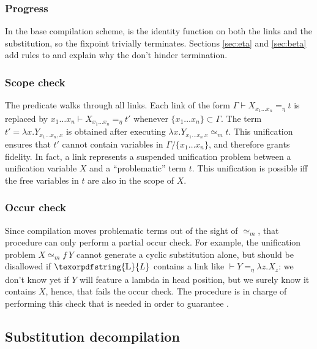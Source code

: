 \documentclass[sigconf,natbib=false,review]{acmart}
\newcommand{\UnifRel}{\ensuremath{\simeq}}
\newcommand{\Ue}{\ensuremath{\UnifRel_m}\xspace}
\newcommand{\linketaM}[3]{\ensuremath{#1 \vdash #2 =_\eta #3}}
\newcommand{\linkStore}{\texorpdfstring{\ensuremath{\mathbb{L}}\xspace}{L}}
\begin{document}


\subsubsection{Progress}
In the base compilation scheme,  is the identity function
on both the links and the substitution, so the fixpoint trivially terminates.
Sections \ref{sec:eta} and \ref{sec:beta} add rules to 
and explain why the don't hinder termination.

\subsubsection{Scope check}\label{sec:sc}
The predicate  walks through all links. 
Each link of the form \linketaM{\Gamma}{X_{x_1\ldots x_n}}{t} is replaced by
\linketaM{{x_1\ldots x_n}}{X_{x_1\ldots x_n}}{t'} whenever $\{x_1\ldots x_n\} \subset \Gamma$.
The term $t' = \lambda x.Y_{{x_1\ldots x_n},x}$ is obtained after
executing $\lambda x.Y_{{x_1\ldots x_n}~x} \Ue t$. This unification
ensures that $t'$ cannot contain variables in $\Gamma / \{x_1\ldots x_n\}$,
and therefore grants fidelity.
In fact, a link represents a suspended unification problem between a unification variable $X$
and a ``problematic'' term $t$. This unification is possible iff 
the free variables in $t$ are also in the scope of $X$.

\subsubsection{Occur check}\label{sec:oc}
Since compilation moves problematic terms out of the sight of \Ue{},
that procedure can only perform a partial occur check. For example, the
unification problem $X \Ue f~Y$ cannot generate a cyclic substitution alone,
but should be disallowed if $\linkStore$ contains a link like
$\linketaM{}{Y}{\lambda z.X_z}$: we don't know yet if $Y$ will feature
a lambda in head position, but we surely know it contains $X$, hence,
that fails the occur check.
The procedure  is in charge of
performing this check that is needed in order to
guarantee .


\subsection{Substitution decompilation}\label{sec:decompilation}
\end{document}
